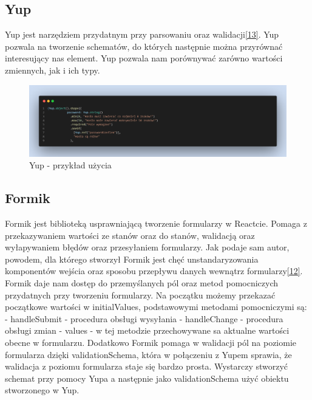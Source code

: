 \documentclass[oneside,polski,logo,indent]{amuthesis}
\begin{document}
\begin{enumerate}
\begin{enumerate}
\begin{figure}[H]
\end{figure}


\subsection{Yup}
Yup jest narzędziem przydatnym przy parsowaniu oraz walidacji\hyperlink{[13]}{[13]}. Yup pozwala na tworzenie schematów, do których następnie
można przyrównać interesujący nas element. Yup pozwala nam porównywać zarówno wartości zmiennych, jak i ich typy.

\begin{figure}[H]
\centering
\includegraphics[width=13cm]{yup przyklad.png}
\caption{Yup - przykład użycia
}

\end{figure}


\subsection{Formik}
Formik jest biblioteką usprawniającą tworzenie formularzy w Reactcie. Pomaga z przekazywaniem wartości ze stanów oraz do stanów, walidacją oraz wyłapywaniem błędów oraz przesyłaniem formularzy.
Jak podaje sam autor, powodem, dla którego stworzył Formik jest chęć unstandaryzowania komponentów wejścia oraz sposobu przepływu danych wewnątrz formularzy\hyperlink{[12]}{[12]}.
\newline
Formik daje nam dostęp do przemyślanych pól oraz metod pomocniczych przydatnych przy tworzeniu formularzy. Na początku możemy przekazać
początkowe wartości w initialValues, podstawowymi metodami pomocniczymi są:
\newline
- handleSubmit - procedura obsługi wysyłania
\newline
- handleChange - procedura obsługi zmian
\newline
- values - w tej metodzie przechowywane sa aktualne wartości obecne w formularzu.
\newline
Dodatkowo Formik pomaga w walidacji pól na poziomie formularza dzięki validationSchema, która w połączeniu z Yupem sprawia, że walidacja z poziomu formularza staje się
bardzo prosta. Wystarczy stworzyć schemat przy pomocy Yupa a następnie jako validationSchema użyć obiektu stworzonego w Yup.


\end{enumerate}
\end{enumerate}
\end{document}
